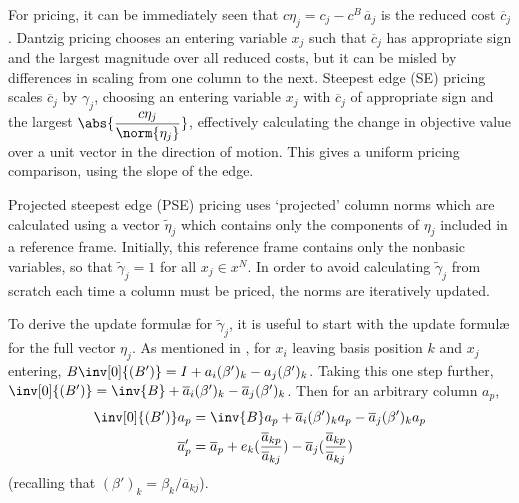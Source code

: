 For pricing, it can be immediately seen that
$c\eta_j = c_j - c^B \, \overline{a}_j$ is the reduced cost $\overline{c}_j$.
Dantzig pricing chooses an entering variable $x_j$ such
that $\overline{c}_j$ has appropriate sign and the largest magnitude over all
reduced costs, but it can be misled by differences in scaling from
one column to the next.
Steepest edge (SE) pricing scales $\overline{c}_j$ by $\gamma_j$, choosing
an entering variable $x_j$ with $\overline{c}_j$ of appropriate sign
and the largest $\displaystyle \abs{\frac{c \eta_j}{\norm{\eta_j}}}$,
effectively
calculating the change in objective value over a unit vector in the direction
of motion.
This gives a uniform pricing comparison, using the slope of the edge.

Projected steepest edge (PSE) pricing uses `projected' column
norms which are calculated using a vector $\tilde{\eta}_j$ which contains only
the components of $\eta_j$ included in a reference frame.
Initially, this reference frame contains only the nonbasic variables, so that
$\tilde{\gamma}_j = 1$ for all $x_j \in x^N$.
In order to avoid calculating $\tilde{\gamma}_j$ from scratch each time a
column must be priced, the norms are iteratively updated.

To derive the update formul\ae{} for $\tilde{\gamma}_j$, it is useful to start
with the update formul\ae{} for the full vector $\eta_j$.
As mentioned in ,
for $x_i$ leaving basis position $k$ and
$x_j$ entering, $B\inv[0]{(B')} = I + a_i(\beta')_k - a_j(\beta')_k$.
Taking this one step further, 
$\inv[0]{(B')} = \inv{B} + \overline{a}_i(\beta')_k - \overline{a}_j(\beta')_k$.
Then for an arbitrary column $a_p$,
\begin{align}
\inv[0]{(B')} a_p & = \inv{B} a_p + \overline{a}_i(\beta')_k a_p -
	\overline{a}_j(\beta')_k a_p \notag \\
\overline{a}'_p & = \overline{a}_p +
	e_k ( \frac{\overline{a}_{kp}}{\overline{a}_{kj}} ) -
	\overline{a}_j ( \frac{\overline{a}_{kp}}{\overline{a}_{kj}} )
	\label{Eqn:abarupdate}
\end{align}
(recalling that $(\beta')_k = \beta_k/\overline{a}_{kj}$).


